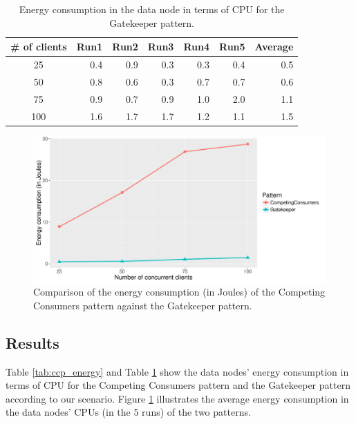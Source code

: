 \documentclass{article}
\begin{document}
\begin{table}[]
    \centering
    \caption{Energy consumption in the data node in terms of CPU for the Gatekeeper pattern.}
    \label{tab:gatekeeper_energy}
    \begin{tabular}{|c|r|r|r|r|r|r|}
        \hline
        \textbf{\# of clients} & \textbf{Run1} & \textbf{Run2} & \textbf{Run3} & \textbf{Run4} & \textbf{Run5} & \textbf{Average}\\ \hline
        25 & 0.4 & 0.9 & 0.3 & 0.3 & 0.4 & 0.5 \\ \hline 
        50 & 0.8 & 0.6 & 0.3 & 0.7 & 0.7 & 0.6 \\ \hline 
        75 & 0.9 & 0.7 & 0.9 & 1.0 & 2.0 & 1.1 \\ \hline 
        100 & 1.6 & 1.7 & 1.7 & 1.2 & 1.1 & 1.5 \\ \hline 
	\end{tabular}
\end{table}

\begin{figure}[t]
    \centering
        \includegraphics[width = \columnwidth]{images/energy.pdf}
    \caption{Comparison of the energy consumption (in Joules) of the Competing Consumers pattern against the Gatekeeper pattern.}
    \label{fig:energy}
\end{figure}


\subsection{Results}
Table \ref{tab:ccp_energy} and Table \ref{tab:gatekeeper_energy} show the data nodes' energy consumption in terms of CPU for the Competing Consumers pattern and the Gatekeeper pattern according to our scenario. Figure \ref{fig:energy} illustrates the average energy consumption in the data nodes' CPUs (in the 5 runs) of the two patterns.\\
\end{document}
